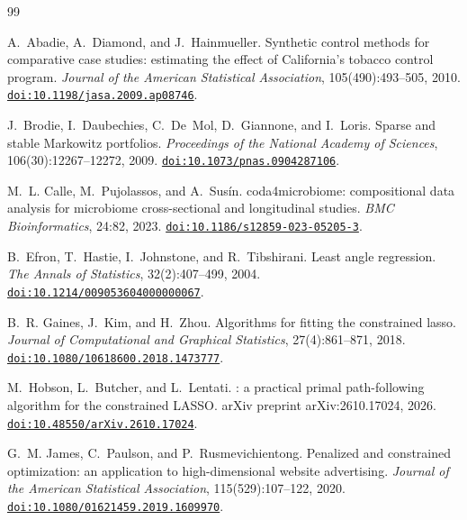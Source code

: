 \documentclass[11pt]{article}
\theoremstyle{remark}
\begin{document}
\begin{thebibliography}{99}\footnotesize\raggedright\setlength{\itemsep}{0pt}

A.~Abadie, A.~Diamond, and J.~Hainmueller.
\newblock Synthetic control methods for comparative case studies: estimating the effect
of {C}alifornia's tobacco control program.
\newblock \emph{Journal of the American Statistical Association}, 105(490):493--505, 2010.
\newblock \href{https://doi.org/10.1198/jasa.2009.ap08746}{\texttt{doi:10.1198/jasa.2009.ap08746}}.


J.~Brodie, I.~Daubechies, C.~De~Mol, D.~Giannone, and I.~Loris.
\newblock Sparse and stable {M}arkowitz portfolios.
\newblock \emph{Proceedings of the National Academy of Sciences}, 106(30):12267--12272,
2009.
\newblock \href{https://doi.org/10.1073/pnas.0904287106}{\texttt{doi:10.1073/pnas.0904287106}}.


M.~L. Calle, M.~Pujolassos, and A.~Sus\'in.
\newblock coda4microbiome: compositional data analysis for microbiome cross-sectional
and longitudinal studies.
\newblock \emph{BMC Bioinformatics}, 24:82, 2023.
\newblock \href{https://doi.org/10.1186/s12859-023-05205-3}{\texttt{doi:10.1186/s12859-023-05205-3}}.


B.~Efron, T.~Hastie, I.~Johnstone, and R.~Tibshirani.
\newblock Least angle regression.
\newblock \emph{The Annals of Statistics}, 32(2):407--499, 2004.
\newblock \href{https://doi.org/10.1214/009053604000000067}{\texttt{doi:10.1214/009053604000000067}}.


B.~R. Gaines, J.~Kim, and H.~Zhou.
\newblock Algorithms for fitting the constrained lasso.
\newblock \emph{Journal of Computational and Graphical Statistics}, 27(4):861--871, 2018.
\newblock \href{https://doi.org/10.1080/10618600.2018.1473777}{\texttt{doi:10.1080/10618600.2018.1473777}}.


M.~Hobson, L.~Butcher, and L.~Lentati.
: a practical primal path-following algorithm for the constrained
{LASSO}.
\newblock arXiv preprint arXiv:2610.17024, 2026.
\newblock \href{https://doi.org/10.48550/arXiv.2610.17024}{\texttt{doi:10.48550/arXiv.2610.17024}}.


G.~M. James, C.~Paulson, and P.~Rusmevichientong.
\newblock Penalized and constrained optimization: an application to high-dimensional
website advertising.
\newblock \emph{Journal of the American Statistical Association}, 115(529):107--122,
2020.
\newblock \href{https://doi.org/10.1080/01621459.2019.1609970}{\texttt{doi:10.1080/01621459.2019.1609970}}.


\end{thebibliography}
\end{document}
